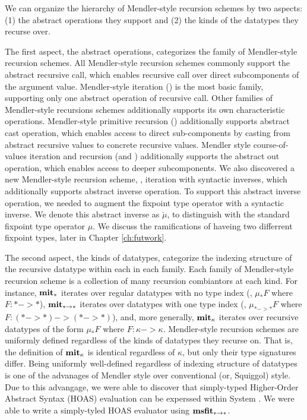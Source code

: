 We can organize the hierarchy of Mendler-style recursion schemes
by two aspects: (1) the abstract operations they support and
(2) the kinds of the datatypes they recurse over.

The first aspect, the abstract operations, categorizes the family
of Mendler-style recursion schemes. All Mendler-style recursion schemes
commonly support the abstract recursive call, which enables recursive
call over direct subcomponents of the argument value.
Mendler-style iteration (\MIt) is the most basic family,
supporting only one abstract operation of recursive call. Other
families of Mendler-style recursions schemes additionally supports
its own characteristic operations. Mendler-style primitive recursion (\MPr)
additionally supports abstract cast operation, which enables access to
direct sub-components by casting from abstract recursive values to
concrete recursive values. Mendler style course-of-values iteration and
recursion (\McvIt and \McvPr) additionally supports the abstract out
operation, which enables access to deeper subcomponents. We also discovered
a new Mendler-style recursion scheme, \MsfIt, iteration with syntactic inverses,
which additionally supports abstract inverse operation. To support
this abstract inverse operation, we needed to augment the fixpoint type operator
with a syntactic inverse. We denote this abstract inverse as $\breve{\mu}$,
to distinguish with the standard fixpoint type operator $\mu$. We discuss
the ramifications of haveing two differrent fixpoint types, later in
Chapter \ref{ch:futwork}.

The second aspect, the kinds of datatypes, categorize the indexing structure
of the recursive datatype within each in each family. Each family of
Mendler-style recursion scheme is a collection of many recursion combiantors
at each kind. For instance, $\mathbf{mit}_{*}$ iterates over regular datatypes
with no type index (\ie, $\mu_{*}F$ where $F : * -> *$), $\mathbf{mit}_{* -> *}$
iterates over datatypes with one type index (\ie, $\mu_{* -> *} F$ where
$F : (* -> *) -> (* -> *)$), and, more generally, $\mathbf{mit}_{\kappa}$ iterates
over recursive datatypes of the form $\mu_{*}F$ where $F : \kappa -> \kappa$.
Mendler-style recursion schemes are uniformly defined regardless of the kinds
of datatypes they recurse on. That is, the definition of $\mathbf{mit}_{\kappa}$ is
identical regardless of $\kappa$, but only their type signatures differ.
Being uniformly well-defined regardless of indexing structure of datatypes
is one of the advanages of Mendler style over conventional (or, Squiggol) style.
Due to this advangage, we were able to discover that simply-typed Higher-Order
Abstract Syntax (HOAS) evaluation can be experssed within System \Fw.
We were able to write a simply-tyled HOAS evaluator using $\mathbf{msfit}_{* -> *}$.

